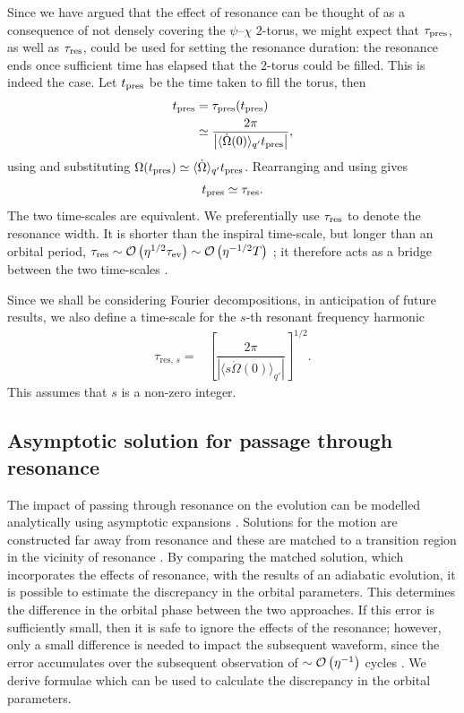 Since we have argued that the effect of resonance can be thought of as a consequence of not densely covering the $\psi$--$\chi$ $2$-torus, we might expect that $\tau_\mathrm{pres}$, as well as $\tau_\mathrm{res}$, could be used for setting the resonance duration: the resonance ends once sufficient time has elapsed that the $2$-torus could be filled. This is indeed the case. Let $t_\mathrm{pres}$ be the time taken to fill the torus, then
\begin{align}
t_\mathrm{pres} = {} & \tau_\mathrm{pres}(t_\mathrm{pres}) \\
 \simeq {} & \dfrac{2\pi}{\left|\langle\dot{\Omega}(0)\rangle_{q'} t_\mathrm{pres}\right|}, \nonumber 
\end{align}
using  and substituting $\Omega(t_\mathrm{pres}) \simeq \langle\dot{\Omega}\rangle_{q'} t_\mathrm{pres}$. Rearranging and using  gives
\begin{equation}
t_\mathrm{pres} \simeq \tau_\mathrm{res}.
\end{equation}
The two time-scales are equivalent. We preferentially use $\tau_\mathrm{res}$ to denote the resonance width. It is shorter than the inspiral time-scale, but longer than an orbital period, $\tau_\mathrm{res} \sim \mathcal{O}\left({\eta^{1/2}\tau_\mathrm{ev}}\right) \sim \mathcal{O}\left({\eta^{-1/2}T}\right)$ \citep{Flanagan2012,Gair2011a}; it therefore acts as a bridge between the two time-scales \citep{Hinderer2008}.

Since we shall be considering Fourier decompositions, in anticipation of future results, we also define a time-scale for the $s$-th resonant frequency harmonic
\begin{align}
\tau_{\mathrm{res},\,s} = {} & \left[\dfrac{2\pi}{\left|\langle s\dot{\Omega}(0)\rangle_{q'}\right|}\right]^{1/2}.
\label{eq:T-res-s}
\end{align}
This assumes that $s$ is a non-zero integer.

\subsection{Asymptotic solution for passage through resonance}\label{sec:res-asymptotic}

The impact of passing through resonance on the evolution can be modelled analytically using asymptotic expansions \citep{Gair2012}. Solutions for the motion are constructed far away from resonance and these are matched to a transition region in the vicinity of resonance \citep{Kevorkian1971,Bosley1992}. By comparing the matched solution, which incorporates the effects of resonance, with the results of an adiabatic evolution, it is possible to estimate the discrepancy in the orbital parameters. This determines the difference in the orbital phase between the two approaches. If this error is sufficiently small, then it is safe to ignore the effects of the resonance; however, only a small difference is needed to impact the subsequent waveform, since the error accumulates over the subsequent observation of $\sim \mathcal{O}\left({\eta^{-1}}\right)$ cycles \citep{Flanagan2012}. We derive formulae which can be used to calculate the discrepancy in the orbital parameters.

